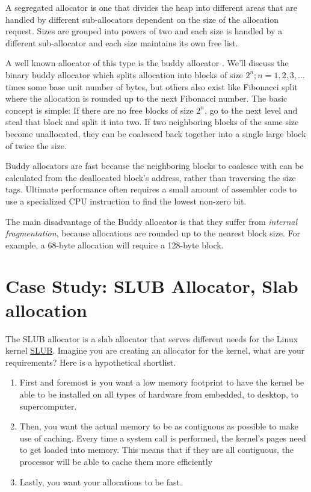 A segregated allocator is one that divides the heap into different areas that are handled by different sub-allocators dependent on the size of the allocation request.
Sizes are grouped into powers of two and each size is handled by a different sub-allocator and each size maintains its own free list.

A well known allocator of this type is the buddy allocator \cite[P. 85]{rangan1999foundations}.
We'll discuss the binary buddy allocator which splits allocation into blocks of size $2^n; n = 1, 2, 3, ...$ times some base unit number of bytes, but others also exist like Fibonacci split where the allocation is rounded up to the next Fibonacci number.
The basic concept is simple: If there are no free blocks of size $2^n$, go to the next level and steal that block and split it into two.
If two neighboring blocks of the same size become unallocated, they can be coalesced back together into a single large block of twice the size.

Buddy allocators are fast because the neighboring blocks to coalesce with can be calculated from the deallocated block's address, rather than traversing the size tags.
Ultimate performance often requires a small amount of assembler code to use a specialized CPU instruction to find the lowest non-zero bit.

The main disadvantage of the Buddy allocator is that they suffer from \emph{internal fragmentation}, because allocations are rounded up to the nearest block size.
For example, a 68-byte allocation will require a 128-byte block.

\section{Case Study: SLUB Allocator, Slab allocation}

The SLUB allocator is a slab allocator that serves different needs for the Linux kernel \href{http://en.wikipedia.org/wiki/SLUB_\%28software\%29}{SLUB}.
Imagine you are creating an allocator for the kernel, what are your requirements?
Here is a hypothetical shortlist.

\begin{enumerate}
\item First and foremost is you want a low memory footprint to have the kernel be able to be installed on all types of hardware from embedded, to desktop, to supercomputer.
\item Then, you want the actual memory to be as contiguous as possible to make use of caching. Every time a system call is performed, the kernel's pages need to get loaded into memory. This means that if they are all contiguous, the processor will be able to cache them more efficiently
\item Lastly, you want your allocations to be fast.
\end{enumerate}

